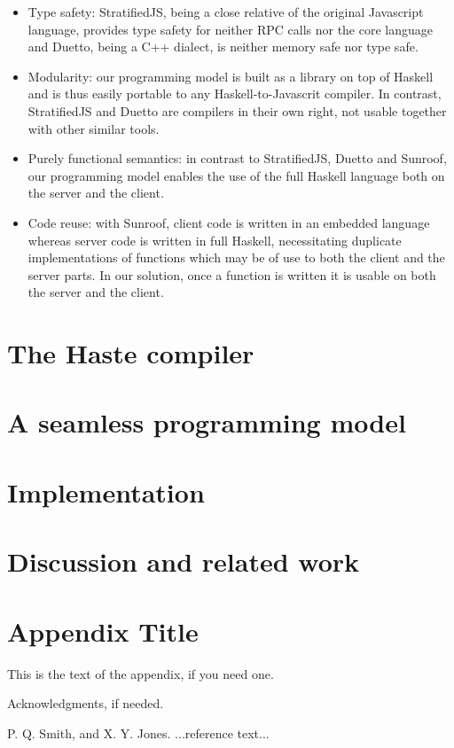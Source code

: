 \documentclass[preprint]{sigplanconf}
\begin{document}
\begin{itemize}
  \item Type safety: StratifiedJS, being a close relative of the original
        Javascript language, provides type safety for neither RPC calls nor the
        core language and Duetto, being a C++ dialect, is neither memory safe
        nor type safe.
  \item Modularity: our programming model is built as a library on top of
        Haskell and is thus easily portable to any Haskell-to-Javascrit
        compiler. In contrast, StratifiedJS and Duetto are compilers in their
        own right, not usable together with other similar tools.
  \item Purely functional semantics: in contrast to StratifiedJS, Duetto and
        Sunroof, our programming model enables the use of the full Haskell
        language both on the server and the client.
  \item Code reuse: with Sunroof, client code is written in an embedded
        language whereas server code is written in full Haskell, necessitating
        duplicate implementations of functions which may be of use to both the
        client and the server parts. In our solution, once a function is
        written it is usable on both the server and the client.
\end{itemize}


\section{The Haste compiler}
\section{A seamless programming model}
\section{Implementation}
\section{Discussion and related work}

\appendix
\section{Appendix Title}

This is the text of the appendix, if you need one.

\acks

Acknowledgments, if needed.





\begin{thebibliography}{}
\softraggedright

P. Q. Smith, and X. Y. Jones. ...reference text...

\end{thebibliography}
\end{document}
